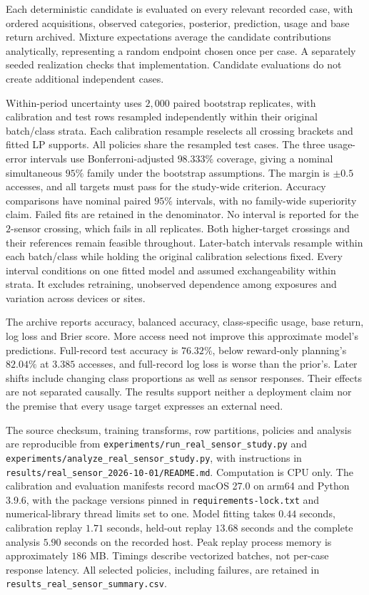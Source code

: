 \documentclass[runningheads]{llncs}
\begin{document}
Each deterministic candidate is evaluated on every relevant recorded case, with ordered acquisitions, observed categories, posterior, prediction, usage and base return archived. Mixture expectations average the candidate contributions analytically, representing a random endpoint chosen once per case. A separately seeded realization checks that implementation. Candidate evaluations do not create additional independent cases.

Within-period uncertainty uses $2{,}000$ paired bootstrap replicates, with calibration and test rows resampled independently within their original batch/class strata. Each calibration resample reselects all crossing brackets and fitted LP supports. All policies share the resampled test cases. The three usage-error intervals use Bonferroni-adjusted $98.333\%$ coverage, giving a nominal simultaneous $95\%$ family under the bootstrap assumptions. The margin is $\pm0.5$ accesses, and all targets must pass for the study-wide criterion. Accuracy comparisons have nominal paired $95\%$ intervals, with no family-wide superiority claim. Failed fits are retained in the denominator. No interval is reported for the $2$-sensor crossing, which fails in all replicates. Both higher-target crossings and their references remain feasible throughout. Later-batch intervals resample within each batch/class while holding the original calibration selections fixed. Every interval conditions on one fitted model and assumed exchangeability within strata. It excludes retraining, unobserved dependence among exposures and variation across devices or sites.

The archive reports accuracy, balanced accuracy, class-specific usage, base return, log loss and Brier score. More access need not improve this approximate model's predictions. Full-record test accuracy is $76.32\%$, below reward-only planning's $82.04\%$ at $3.385$ accesses, and full-record log loss is worse than the prior's. Later shifts include changing class proportions as well as sensor responses. Their effects are not separated causally. The results support neither a deployment claim nor the premise that every usage target expresses an external need.

The source checksum, training transforms, row partitions, policies and analysis are reproducible from \texttt{experiments/\allowbreak run\_real\_sensor\_study.py} and \texttt{experiments/\allowbreak analyze\_real\_sensor\_study.py}, with instructions in \texttt{results/\allowbreak real\_sensor\_2026-10-01/\allowbreak README.md}. Computation is CPU only. The calibration and evaluation manifests record macOS 27.0 on arm64 and Python 3.9.6, with the package versions pinned in \texttt{requirements-lock.txt} and numerical-library thread limits set to one. Model fitting takes $0.44$ seconds, calibration replay $1.71$ seconds, held-out replay $13.68$ seconds and the complete analysis $5.90$ seconds on the recorded host. Peak replay process memory is approximately $186$ MB. Timings describe vectorized batches, not per-case response latency. All selected policies, including failures, are retained in \texttt{results\_real\_sensor\_summary.csv}.
\end{document}
